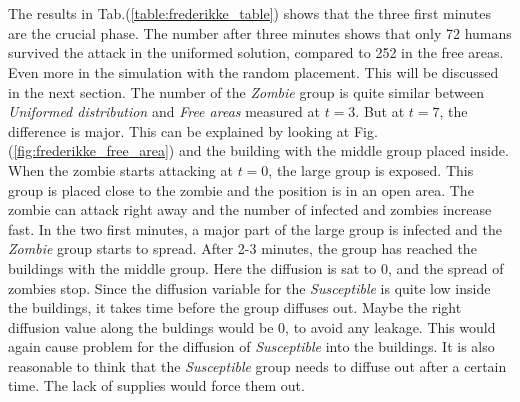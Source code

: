 \documentclass[%
twoside,                 %
final,                   %
10pt]{article}
\begin{document}
\\
\\
The results in Tab.(\ref{table:frederikke_table}) shows that the three first minutes are the crucial phase. The number after three minutes shows that only 72 humans survived the attack in the uniformed solution, compared to 252 in the free areas. Even more in the simulation with the random placement. This will be discussed in the next section. The number of the \emph{Zombie} group is quite similar between \emph{Uniformed distribution} and \emph{Free areas} measured at $t=3$. But at $t=7$, the difference is major. This can be explained by looking at Fig.(\ref{fig:frederikke_free_area}) and the building with the middle group placed inside. When the zombie starts attacking at $t=0$, the large group is exposed. This group is placed close to the zombie and the position is in an open area. The zombie can attack right away and the number of infected and zombies increase fast. In the two first minutes, a major part of the large group is infected and the \emph{Zombie} group starts to spread. After 2-3 minutes, the group has reached the buildings with the middle group. Here the diffusion is sat to 0, and the spread of zombies stop. Since the diffusion variable for the \emph{Susceptible} is quite low inside the buildings, it takes time before the group diffuses out. Maybe the right diffusion value along the buldings would be 0, to avoid any leakage. This would again cause problem for the diffusion of \emph{Susceptible} into the buildings. It is also reasonable to think that the \emph{Susceptible} group needs to diffuse out after a certain time. The lack of supplies would force them out.




\label{table:frederikke_table}
\end{document}
